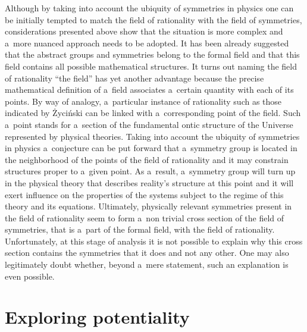 Although by taking into account the ubiquity of symmetries in physics one can be initially tempted to match the field of rationality with the field of symmetries, considerations presented above show that the situation is more complex and a~more nuanced approach needs to be adopted. It has been already suggested that the abstract groups and symmetries belong to the formal field and that this field contains all possible mathematical structures. It turns out naming the field of rationality ``the field'' has yet another advantage because the precise mathematical definition of a~field associates a~certain quantity with each of its points. By way of analogy, a~particular instance of rationality such as those indicated by Życiński can be linked with a~corresponding point of the field. Such a~point stands for a~section of the fundamental ontic structure of the Universe represented by physical theories. Taking into account the ubiquity of symmetries in physics a~conjecture can be put forward that a~symmetry group is located in the neighborhood of the points of the field of rationality and it may constrain structures proper to a~given point. As a~result, a~symmetry group will turn up in the physical theory that describes reality's structure at this point and it will exert influence on the properties of the systems subject to the regime of this theory and its equations. Ultimately, physically relevant symmetries present in the field of rationality seem to form a~non trivial cross section of the field of symmetries, that is a~part of the formal field, with the field of rationality. Unfortunately, at this stage of analysis it is not possible to explain why this cross section contains the symmetries that it does and not any other. One may also legitimately doubt whether, beyond a~mere statement, such an explanation is even possible.



\section{Exploring potentiality}

